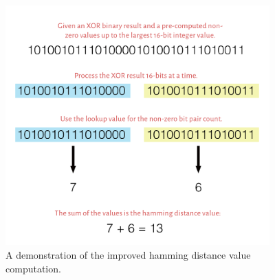 \begin{figure}[h]
	\centering
	\includegraphics[width=4.0in]{contents/00_images/usage-improved-hd}\vspace*{5pt}
	
	\caption{A demonstration of the improved hamming distance value computation.}
	\label{fig:usage-improved-hd}
\end{figure}